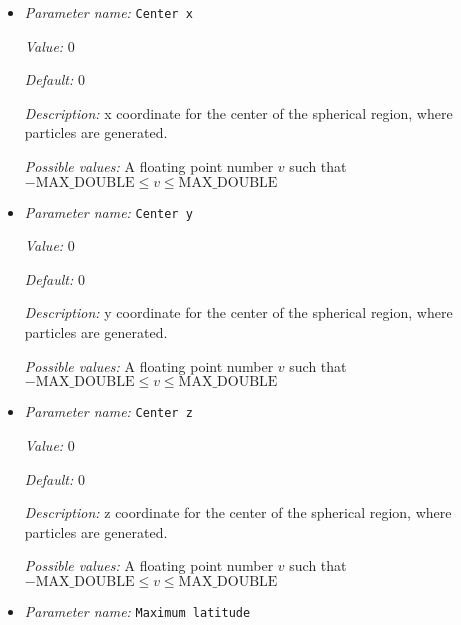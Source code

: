 \begin{itemize}
\item {\it Parameter name:} {\tt Center x}
\label{parameters:Postprocess/Particles/Generator/Uniform radial/Center x}
\label{parameters:Postprocess/Particles/Generator/Uniform_20radial/Center_20x}


{\it Value:} 0


{\it Default:} 0


{\it Description:} x coordinate for the center of the spherical region, where particles are generated.


{\it Possible values:} A floating point number $v$ such that $-\text{MAX\_DOUBLE} \leq v \leq \text{MAX\_DOUBLE}$
\item {\it Parameter name:} {\tt Center y}
\label{parameters:Postprocess/Particles/Generator/Uniform radial/Center y}
\label{parameters:Postprocess/Particles/Generator/Uniform_20radial/Center_20y}


{\it Value:} 0


{\it Default:} 0


{\it Description:} y coordinate for the center of the spherical region, where particles are generated.


{\it Possible values:} A floating point number $v$ such that $-\text{MAX\_DOUBLE} \leq v \leq \text{MAX\_DOUBLE}$
\item {\it Parameter name:} {\tt Center z}
\label{parameters:Postprocess/Particles/Generator/Uniform radial/Center z}
\label{parameters:Postprocess/Particles/Generator/Uniform_20radial/Center_20z}


{\it Value:} 0


{\it Default:} 0


{\it Description:} z coordinate for the center of the spherical region, where particles are generated.


{\it Possible values:} A floating point number $v$ such that $-\text{MAX\_DOUBLE} \leq v \leq \text{MAX\_DOUBLE}$
\item {\it Parameter name:} {\tt Maximum latitude}
\label{parameters:Postprocess/Particles/Generator/Uniform radial/Maximum latitude}
\label{parameters:Postprocess/Particles/Generator/Uniform_20radial/Maximum_20latitude}



\end{itemize}
